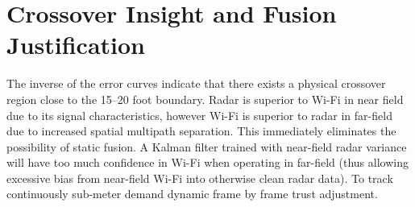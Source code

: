\section{Crossover Insight and Fusion Justification}
\label{sec:crossover}

The inverse of the error curves indicate that there exists a physical crossover region close to the 15--20 foot boundary. Radar is superior to Wi-Fi in near field due to its signal characteristics, however Wi-Fi is superior to radar in far-field due to increased spatial multipath separation. This immediately eliminates the possibility of static fusion. A Kalman filter trained with near-field radar variance will have too much confidence in Wi-Fi when operating in far-field (thus allowing excessive bias from near-field Wi-Fi into otherwise clean radar data). To track continuously sub-meter demand dynamic frame by frame trust adjustment.
